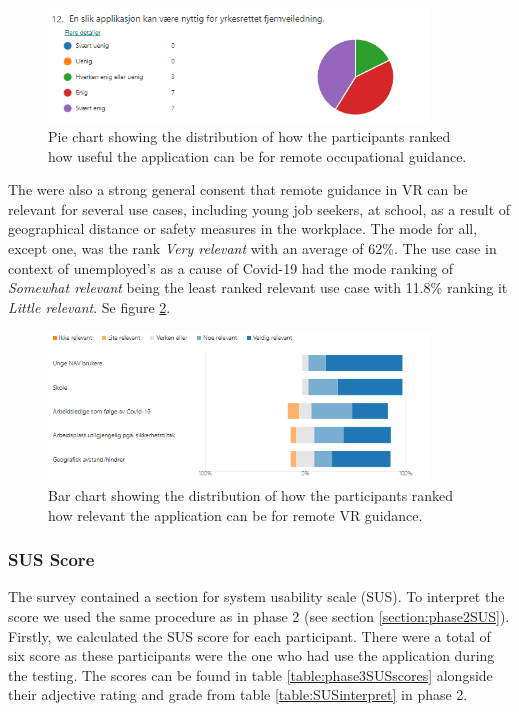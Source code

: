 \begin{figure}[H]
  \centering
   \captionsetup{width=.8\linewidth}
    \includegraphics[width=0.9\textwidth]{fig/phase_3/survey/remoteUsage.PNG}
 \caption{Pie chart showing the distribution of how the participants ranked how useful the application can be for remote occupational guidance.}
\label{fig:phase3_AppBeUsed}
\end{figure}


The were also a strong general consent that remote guidance in VR can be relevant for several use cases, including young job seekers, at school, as a result of geographical distance or 
safety measures in the workplace. The mode for all, except one, was the rank \textit{Very relevant} with an average of 62\%. The use case in context of unemployed's as a cause of Covid-19 had the mode ranking of \textit{Somewhat relevant} being the least ranked relevant use case with 11.8\%  ranking it \textit{Little relevant}. Se figure \ref{fig:phase3_RemoteUsecases}.    

\begin{figure}[H]
  \centering
   \captionsetup{width=.8\linewidth}
    \includegraphics[width=0.9\textwidth]{fig/phase_3/survey/RemoteUseCases.PNG}
 \caption{Bar chart showing the distribution of how the participants ranked how relevant the application can be for remote VR guidance.}
\label{fig:phase3_RemoteUsecases}
\end{figure}


\subsubsection{SUS Score}
The survey contained a section for system usability scale (SUS). To interpret the score we used the same procedure as in phase 2 (see section \ref{section:phase2SUS}). Firstly, we calculated the SUS score for each participant. There were a total of six score as these participants were the one who had use the application during the testing. The scores can be found in table \ref{table:phase3SUSscores} alongside their adjective rating and grade from table \ref{table:SUSinterpret} in phase 2.


